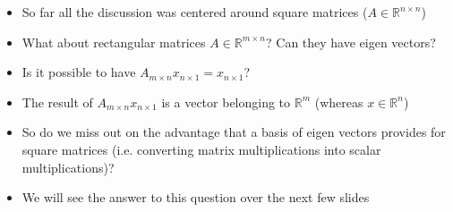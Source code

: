 \begin{frame}
  \begin{overlayarea}{\textwidth}{\textheight}
    \vspace{0.9cm}
    \begin{itemize}\justifying
      \item<1-> So far all the discussion was centered around square matrices ($A \in \mathbb{R}^{n \times n}$)
      \item<2-> What about rectangular matrices $A \in \mathbb{R}^{m \times n}$? Can they have eigen vectors?
      \item<3-> Is it possible to have $A_{m \times n} x_{n \times 1} = x_{n \times 1}$? 
      \item<5-> The result of $A_{m \times n} x_{n \times 1}$ is a vector belonging to $\mathbb{R}^m$ (whereas $x \in \mathbb{R}^n$)
      \item<6-> So do we miss out on the advantage that a basis of eigen vectors provides for square matrices (i.e. converting matrix multiplications into scalar multiplications)?
      \item<7-> We will see the answer to this question over the next few slides
    \end{itemize}
  \end{overlayarea}
\end{frame}

